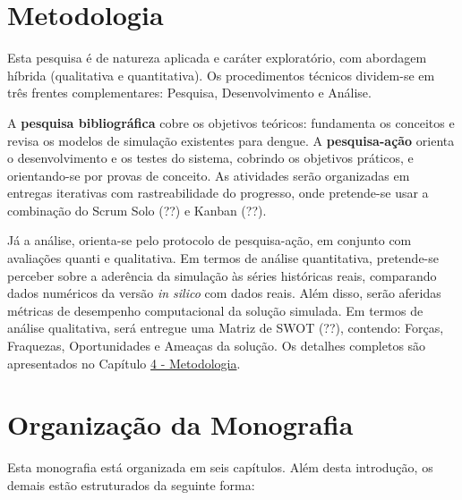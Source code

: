 \section{Metodologia}
\label{1-metodologia}

Esta pesquisa é de natureza aplicada e caráter exploratório, com abordagem híbrida
(qualitativa e quantitativa). Os procedimentos técnicos dividem-se em três frentes
complementares: Pesquisa, Desenvolvimento e Análise.

A \textbf{pesquisa bibliográfica} cobre os objetivos teóricos: fundamenta os conceitos
e revisa os modelos de simulação existentes para dengue. A \textbf{pesquisa-ação} %
orienta o desenvolvimento e os testes do sistema, cobrindo os objetivos práticos,
e orientando-se por provas de conceito. As atividades serão organizadas em entregas
iterativas com rastreabilidade do progresso, onde pretende-se usar a combinação 
do Scrum Solo (??) e Kanban (??). %

Já a análise, orienta-se pelo protocolo de pesquisa-ação, em conjunto com avaliações quanti e qualitativa.
Em termos de análise quantitativa, pretende-se perceber sobre a aderência da simulação às séries históricas
reais, comparando dados numéricos da versão \textit{in silico} com dados reais. Além disso, serão aferidas métricas
de desempenho computacional da solução simulada. Em termos de análise qualitativa, será entregue uma
Matriz de SWOT (??), contendo: Forças, Fraquezas, Oportunidades e Ameaças da solução. %
Os detalhes completos são apresentados no Capítulo \hyperref[1-metodologia]{4 - Metodologia}. 

\section{Organização da Monografia}
\label{1-organizacao}

Esta monografia está organizada em seis capítulos. Além desta introdução, os demais estão estruturados da seguinte forma:

